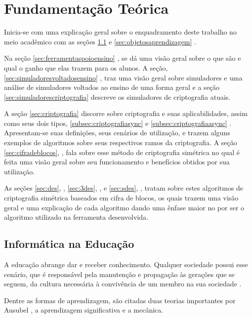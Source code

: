 \chapter{Fundamentação Teórica}
\label{char:fundteorica}
Inicia-se com uma explicação geral sobre o enquadramento deste trabalho no meio acadêmico com as seções \ref{sec:informaticaeducacao}  e \ref{sec:objetosaprendizagem} .
 
Na seção \ref{sec:ferramentaspoioensino} , se dá uma visão geral sobre o que são e qual o ganho que elas trazem para os alunos. A seção, \ref{sec:simuladoresvoltadosensino} , traz uma visão geral sobre simuladores e uma análise de simuladores voltados ao ensino de uma forma geral e a seção \ref{sec:simuladorescriptografia} descreve os simuladores de criptografia atuais.

A seção \ref{sec:criptografia}  discorre sobre criptografia e suas aplicabilidades, assim como seus dois tipos, \ref{subsec:criptografiasync}  e \ref{subsec:criptografiaasync} . Apresentam-se suas definições, seus cenários de utilização, e trazem alguns exemplos de algoritmos sobre seus respectivos ramos da criptografia. A seção \ref{sec:cifradeblocos}, , fala sobre esse método de criptografia simétrica no qual é feita uma visão geral sobre seu funcionamento e benefícios obtidos por sua utilização.

As seções \ref{sec:des}, , \ref{sec:3des}, , e \ref{sec:sdes}, , tratam sobre estes algoritmos de criptografia simétrica baseados em cifra de blocos, os quais trazem uma visão geral e uma explicação de cada algoritmo dando uma ênfase maior no  por ser o algoritmo utilizado na ferramenta desenvolvida.

\section{Informática na Educação}
\label{sec:informaticaeducacao}
A educação abrange dar e receber conhecimento. Qualquer sociedade possui esse cenário, que é responsável pela manutenção e propagação às gerações que se seguem, da cultura necessária à convivência de um membro na sua sociedade \cite{hamawaki09}.

Dentre as formas de aprendizagem, são citadas duas teorias importantes por Ausubel \cite{ausubel80}, a aprendizagem significativa e a mecânica.

